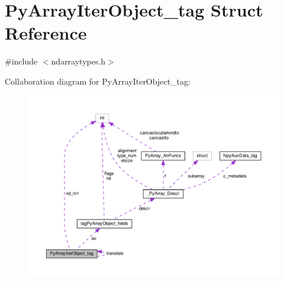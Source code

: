 \hypertarget{structPyArrayIterObject__tag}{}\section{Py\+Array\+Iter\+Object\+\_\+tag Struct Reference}
\label{structPyArrayIterObject__tag}


{\ttfamily \#include $<$ndarraytypes.\+h$>$}



Collaboration diagram for Py\+Array\+Iter\+Object\+\_\+tag\+:
\nopagebreak
\begin{figure}[H]
\begin{center}
\leavevmode
\includegraphics[width=350pt]{structPyArrayIterObject__tag__coll__graph}
\end{center}
\end{figure}
